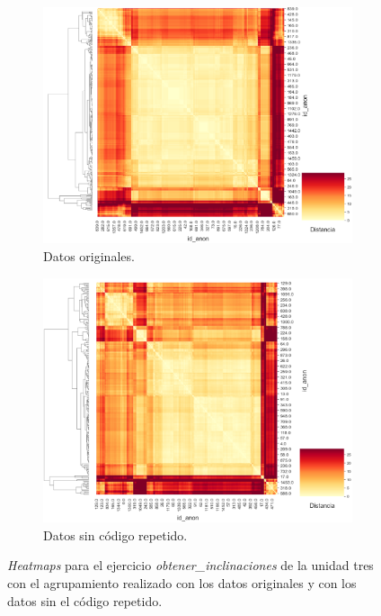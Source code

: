 \documentclass[11pt,a4paper,twoside,openany]{tesis}
\begin{document}
\begin{figure}[H]
    \centering
    \begin{subfigure}{0.45\textwidth}
        \includegraphics[width=\linewidth]{imagenes/codigo-reptido-original.png}
        \caption{Datos originales.}
        \label{fig:figura3}
    \end{subfigure}
    \hfill
    \begin{subfigure}{0.45\textwidth}
        \includegraphics[width=\linewidth]{imagenes/codigo-reptido-uniques.png}
        \caption{Datos sin código repetido.}
        \label{fig:figura4}
    \end{subfigure}
    \caption{\emph{Heatmaps} para el ejercicio \emph{obtener\_inclinaciones} de la unidad tres con el agrupamiento realizado con los datos originales y con los datos sin el código repetido.}
    \label{fig:figuras_juntas}
\end{figure}
\end{document}
